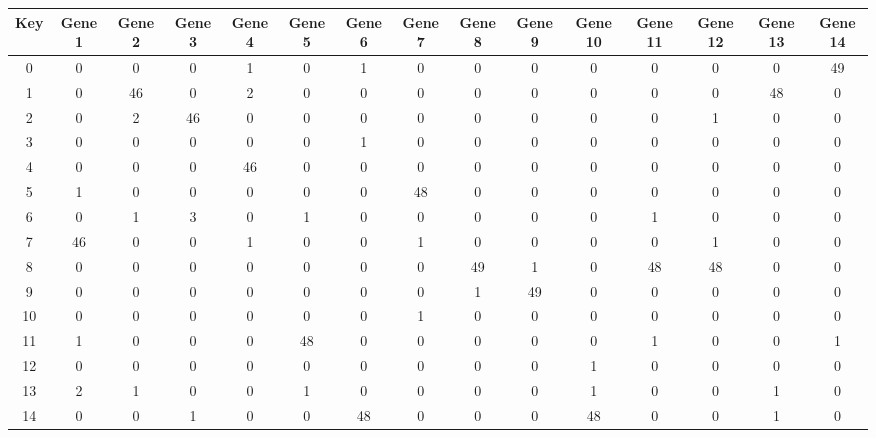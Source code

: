 \begin{tabular}{|c|c|c|c|c|c|c|c|c|c|c|c|c|c|c|}
\hline
Key & Gene 1 & Gene 2 & Gene 3 & Gene 4 & Gene 5 & Gene 6 & Gene 7 & Gene 8 & Gene 9 & Gene 10 & Gene 11 & Gene 12 & Gene 13 & Gene 14 \\
\hline
0 & 0 & 0 & 0 & 1 & 0 & 1 & 0 & 0 & 0 & 0 & 0 & 0 & 0 & 49 \\
1 & 0 & 46 & 0 & 2 & 0 & 0 & 0 & 0 & 0 & 0 & 0 & 0 & 48 & 0 \\
2 & 0 & 2 & 46 & 0 & 0 & 0 & 0 & 0 & 0 & 0 & 0 & 1 & 0 & 0 \\
3 & 0 & 0 & 0 & 0 & 0 & 1 & 0 & 0 & 0 & 0 & 0 & 0 & 0 & 0 \\
4 & 0 & 0 & 0 & 46 & 0 & 0 & 0 & 0 & 0 & 0 & 0 & 0 & 0 & 0 \\
5 & 1 & 0 & 0 & 0 & 0 & 0 & 48 & 0 & 0 & 0 & 0 & 0 & 0 & 0 \\
6 & 0 & 1 & 3 & 0 & 1 & 0 & 0 & 0 & 0 & 0 & 1 & 0 & 0 & 0 \\
7 & 46 & 0 & 0 & 1 & 0 & 0 & 1 & 0 & 0 & 0 & 0 & 1 & 0 & 0 \\
8 & 0 & 0 & 0 & 0 & 0 & 0 & 0 & 49 & 1 & 0 & 48 & 48 & 0 & 0 \\
9 & 0 & 0 & 0 & 0 & 0 & 0 & 0 & 1 & 49 & 0 & 0 & 0 & 0 & 0 \\
10 & 0 & 0 & 0 & 0 & 0 & 0 & 1 & 0 & 0 & 0 & 0 & 0 & 0 & 0 \\
11 & 1 & 0 & 0 & 0 & 48 & 0 & 0 & 0 & 0 & 0 & 1 & 0 & 0 & 1 \\
12 & 0 & 0 & 0 & 0 & 0 & 0 & 0 & 0 & 0 & 1 & 0 & 0 & 0 & 0 \\
13 & 2 & 1 & 0 & 0 & 1 & 0 & 0 & 0 & 0 & 1 & 0 & 0 & 1 & 0 \\
14 & 0 & 0 & 1 & 0 & 0 & 48 & 0 & 0 & 0 & 48 & 0 & 0 & 1 & 0 \\
\hline
\end{tabular}